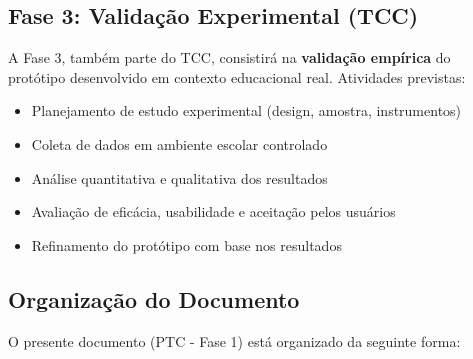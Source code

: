 \subsection{Fase 3: Validação Experimental (TCC)}

A Fase 3, também parte do TCC, consistirá na \textbf{validação empírica} do protótipo desenvolvido em contexto educacional real. Atividades previstas:

\begin{itemize}
    \item Planejamento de estudo experimental (design, amostra, instrumentos)
    \item Coleta de dados em ambiente escolar controlado
    \item Análise quantitativa e qualitativa dos resultados
    \item Avaliação de eficácia, usabilidade e aceitação pelos usuários
    \item Refinamento do protótipo com base nos resultados
\end{itemize}

\subsection{Organização do Documento}

O presente documento (PTC - Fase 1) está organizado da seguinte forma:


